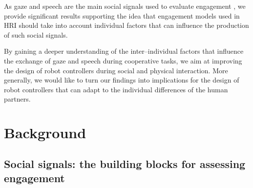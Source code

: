 \documentclass[twocolumn]{svjour3}          %
\begin{document}
As gaze and speech are the main social signals used to evaluate engagement \cite{rich2010recognizing}, we provide significant results supporting the idea that engagement models used in HRI should take into account individual factors that can influence the production of such social signals.

By gaining a deeper understanding of the inter--individual factors that influence the exchange of gaze and speech during cooperative tasks, we aim at improving the design of robot controllers during social and physical interaction.
More generally, we would like to turn our findings into implications for the design of robot controllers that can adapt to the individual differences of the human partners.




\section{Background}\label{sec:background}



\subsection{Social signals: the building blocks for assessing engagement}
\end{document}
